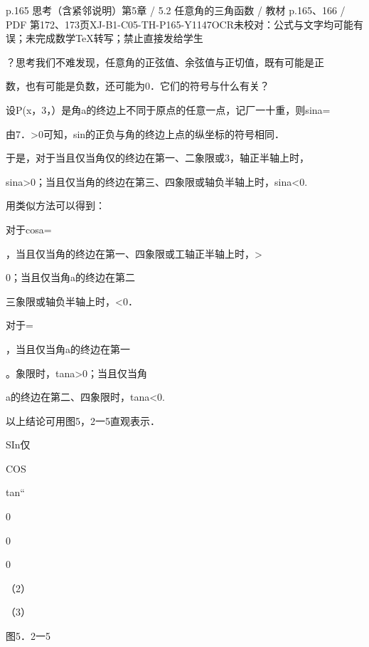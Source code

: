 \begin{bankitem}{p.165 思考（含紧邻说明）}{第5章 / 5.2 任意角的三角函数 / 教材 p.165、166 / PDF 第172、173页}{XJ-B1-C05-TH-P165-Y1147}{OCR未校对：公式与文字均可能有误；未完成数学TeX转写；禁止直接发给学生}
\begin{ocrdraft}
\par
？思考我们不难发现，任意角的正弦值、余弦值与正切值，既有可能是正
\par
数，也有可能是负数，还可能为0．它们的符号与什么有关？
\par
设P(x，3，）是角a的终边上不同于原点的任意一点，记厂一十重，则sina=
\par
由7．>0可知，sin的正负与角的终边上点的纵坐标的符号相同．
\par
于是，对于当且仅当角仅的终边在第一、二象限或3，轴正半轴上时，
\par
sina>0；当且仅当角的终边在第三、四象限或轴负半轴上时，sina<0.
\par
用类似方法可以得到：
\par
对于cosa=
\par
，当且仅当角的终边在第一、四象限或工轴正半轴上时，>
\par
0；当且仅当角a的终边在第二
\par
三象限或轴负半轴上时，<0．
\par
[教材p.166 / PDF第173页]
\par
对于=
\par
，当且仅当角a的终边在第一
\par
。象限时，tana>0；当且仅当角
\par
a的终边在第二、四象限时，tana<0.
\par
以上结论可用图5，2一5直观表示．
\par
SIn仅
\par
COS
\par
tan“
\par
0
\par
0
\par
0
\par
（2）
\par
（3）
\par
图5．2一5
\end{ocrdraft}
\end{bankitem}
